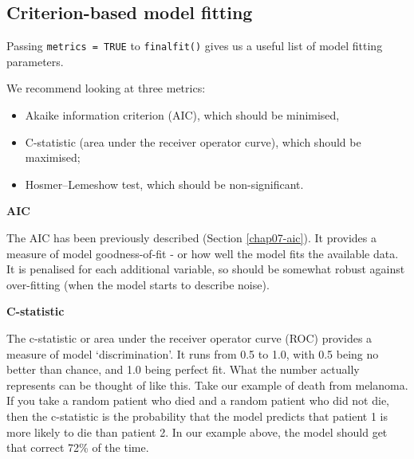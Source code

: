 \documentclass[
  12pt,
  krantz2]{krantz}
\providecommand{\tightlist}{%
  \setlength{\itemsep}{0pt}\setlength{\parskip}{0pt}}
\begin{document}
\begin{table}[!h]

\caption{\label{tab:unnamed-chunk-18}Model metrics: 5-year survival from malignant melanoma by tumour ulceration (fit 1).}
\centering
{}
\end{table}

\hypertarget{criterion-based-model-fitting}{%
\subsection{Criterion-based model fitting}\label{criterion-based-model-fitting}}

Passing \texttt{metrics\ =\ TRUE} to \texttt{finalfit()} gives us a useful list of model fitting parameters.

We recommend looking at three metrics:

\begin{itemize}
\tightlist
\item
  Akaike information criterion (AIC), which should be minimised,
\item
  C-statistic (area under the receiver operator curve), which should be maximised;
\item
  Hosmer--Lemeshow test, which should be non-significant.
\end{itemize}

\textbf{AIC}

The AIC has been previously described (Section \ref{chap07-aic}).
It provides a measure of model goodness-of-fit - or how well the model fits the available data.
It is penalised for each additional variable, so should be somewhat robust against over-fitting (when the model starts to describe noise).

\textbf{C-statistic}

The c-statistic or area under the receiver operator curve (ROC) provides a measure of model `discrimination'.
It runs from 0.5 to 1.0, with 0.5 being no better than chance, and 1.0 being perfect fit.
What the number actually represents can be thought of like this.
Take our example of death from melanoma.
If you take a random patient who died and a random patient who did not die, then the c-statistic is the probability that the model predicts that patient 1 is more likely to die than patient 2.
In our example above, the model should get that correct 72\% of the time.
\end{document}
